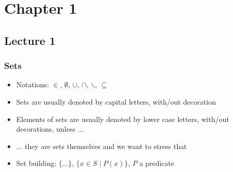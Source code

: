 \documentclass[handout]{beamer}
\title[INF210 presentations]{}
\begin{document}
\section{Chapter 1}
\subsection{Lecture 1}
 


\frame
  {
    
    \frametitle{Sets}\label{Ch1:sets}

 \begin{itemize}[<+->]
\item Notations: $\in$, $\emptyset$, $\cup$, $\cap$, $\backslash$, $\subseteq$
\item Sets are usually denoted by capital letters, with/out decoration
\item Elements of sets are usually denoted by lower case letters, with/out decorations, unless ...
\item ...  they are sets themselves and we want to stress that
\item Set building: $\{ \ldots \}$, $\{x \in S \mid P(x) \}$, $P$ a predicate
 
 \end{itemize}

 }
\end{document}
